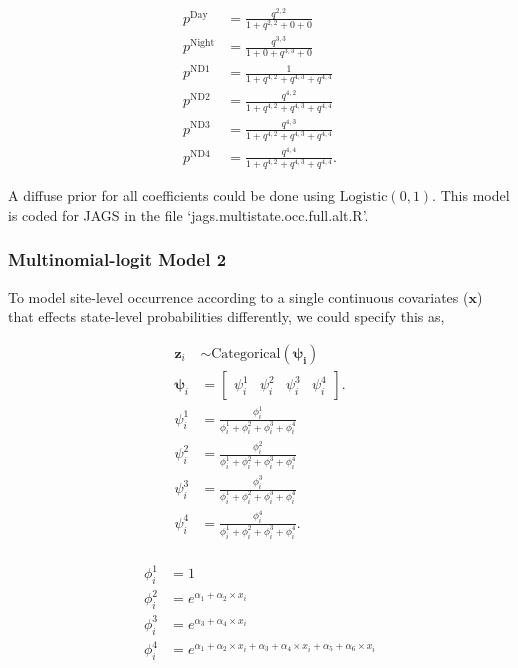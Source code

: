 \documentclass[12pt]{article}
\begin{document}
\begin{center}
\begin{align*}
p^{\text{Day}} &=\frac{q^{2,2}}{1+q^{2,2}+0+0}\\
p^{\text{Night}} &=\frac{q^{3,3}}{1+0+q^{3,3}+0}\\
p^{\text{ND1}} &=\frac{1}{1+q^{4,2}+q^{4,3}+q^{4,4}}\\
p^{\text{ND2}} &=\frac{q^{4,2}}{1+q^{4,2}+q^{4,3}+q^{4,4}}\\
p^{\text{ND3}} &=\frac{q^{4,3}}{1+q^{4,2}+q^{4,3}+q^{4,4}}\\
p^{\text{ND4}} &=\frac{q^{4,4}}{1+q^{4,2}+q^{4,3}+q^{4,4}}.
\end{align*}
\end{center}
A diffuse prior for all coefficients could be done using $\text{Logistic}(0,1).$ This model is coded for JAGS in the file `jags.multistate.occ.full.alt.R'.

\subsubsection{Multinomial-logit Model 2}
To model site-level occurrence according to a single continuous covariates ($\mathbf{x}$) that effects state-level probabilities differently, we could specify this as,
\begin{center}
\begin{align*}
\textbf{z}_{i} &\sim \text{Categorical}(\boldsymbol{\psi_{i}})\\
\boldsymbol{\psi}_{i} &= \begin{bmatrix} \psi^1_{i} & \psi^2_{i} & \psi^3_{i} & \psi^4_{i} \end{bmatrix}.\\
\psi^1_{i} &=\frac{\phi^1_{i}}{\phi^1_{i}+ \phi^2_{i}+\phi^3_{i}+\phi^4_{i}}\\
\psi^2_{i} &=\frac{\phi^2_{i}}{\phi^1_{i}+ \phi^2_{i}+\phi^3_{i}+\phi^4_{i}}\\
\psi^3_{i} &=\frac{\phi^3_{i}}{\phi^1_{i}+ \phi^2_{i}+\phi^3_{i}+\phi^4_{i}}\\
\psi^4_{i} &=\frac{\phi^4_{i}}{\phi^1_{i}+ \phi^2_{i}+\phi^3_{i}+\phi^4_{i}}.\\
\end{align*}
\end{center}

\begin{center}
\begin{align*}
\phi^1_{i} &= 1\\
\phi^2_{i} &= e^{\alpha_{1}+\alpha_{2}\times x_{i}}\\
\phi^3_{i} &= e^{\alpha_{3}+\alpha_{4}\times x_{i}}\\
\phi^4_{i} &= e^{\alpha_{1}+\alpha_{2}\times x_{i}+\alpha_{3}+\alpha_{4}\times x_{i}+\alpha_{5}+\alpha_{6}\times x_{i}}\\
\end{align*}
\end{center}
\end{document}
